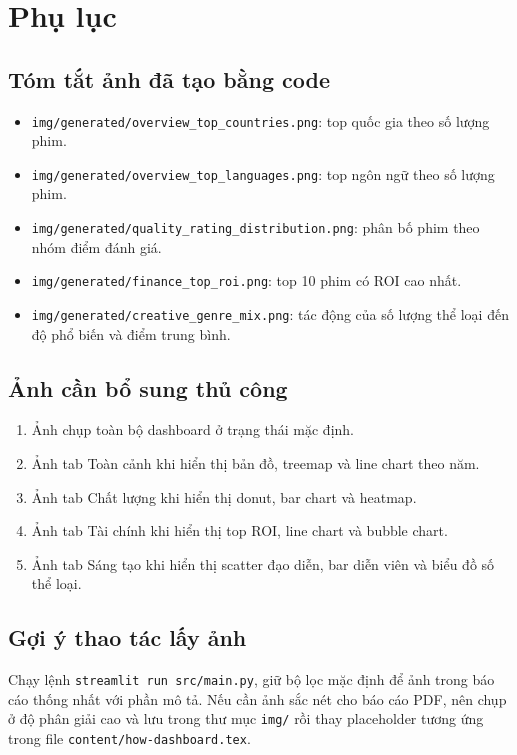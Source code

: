 \section{Phụ lục}

\subsection{Tóm tắt ảnh đã tạo bằng code}
\begin{itemize}[leftmargin=2em]
    \item \texttt{img/generated/overview\_top\_countries.png}: top quốc gia theo số lượng phim.
    \item \texttt{img/generated/overview\_top\_languages.png}: top ngôn ngữ theo số lượng phim.
    \item \texttt{img/generated/quality\_rating\_distribution.png}: phân bố phim theo nhóm điểm đánh giá.
    \item \texttt{img/generated/finance\_top\_roi.png}: top 10 phim có ROI cao nhất.
    \item \texttt{img/generated/creative\_genre\_mix.png}: tác động của số lượng thể loại đến độ phổ biến và điểm trung bình.
\end{itemize}

\subsection{Ảnh cần bổ sung thủ công}
\begin{enumerate}[leftmargin=2em]
    \item Ảnh chụp toàn bộ dashboard ở trạng thái mặc định.
    \item Ảnh tab Toàn cảnh khi hiển thị bản đồ, treemap và line chart theo năm.
    \item Ảnh tab Chất lượng khi hiển thị donut, bar chart và heatmap.
    \item Ảnh tab Tài chính khi hiển thị top ROI, line chart và bubble chart.
    \item Ảnh tab Sáng tạo khi hiển thị scatter đạo diễn, bar diễn viên và biểu đồ số thể loại.
\end{enumerate}

\subsection{Gợi ý thao tác lấy ảnh}
Chạy lệnh \texttt{streamlit run src/main.py}, giữ bộ lọc mặc định để ảnh trong báo cáo thống nhất với phần mô tả. Nếu cần ảnh sắc nét cho báo cáo PDF, nên chụp ở độ phân giải cao và lưu trong thư mục \texttt{img/} rồi thay placeholder tương ứng trong file \texttt{content/how-dashboard.tex}.
